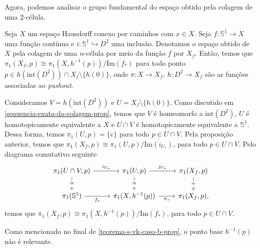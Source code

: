 Agora, podemos analisar o grupo fundamental do espaço obtido pela colagem de uma 2-célula.

\begin{corol}
    Seja $X$ um espaço Hausdorff conexo por caminhos com $x\in X$. Seja $f:\mathbb{S}^{1}\rightarrow X$ uma função contínua e $i:\mathbb{S}^{1}\hookrightarrow D^2$ uma inclusão. Denotamos o espaço obtido de $X$ pela colagem de uma $n$-célula por meio da função $f$ por $X_f$. Então, temos que $\pi_1(X_f, p)\cong \pi_1(X,h^{-1}(p))/\overline{\text{Im}(f_*)}$ para todo ponto $p\in h(\text{int}(D^2))\cap X_f\setminus\{h(0)\}$, onde $\pi:X\rightarrow X_f$, $h:D^2\rightarrow X_f$ são as funções associadas ao \emph{pushout}.
\end{corol}
\begin{dem}
     Consideramos $V=h(\text{int}(D^2))$ e $U=X_f\setminus \{h(0)\}$. Como discutido em \ref{sequencia-exata-da-colagem-prop}, temos que $V$ é homeomorfo a $\text{int}(D^2)$, $U$ é homotopicamente equivalente a $X$ e $U\cap V$ é homotopicamente equivalente a $\mathbb{S}^{1}$. Dessa forma, temos $\pi_1(U,p)=\{e\}$ para todo $p\in U\cap V$. Pela proposição anterior, temos que $\pi_1(X_f,p)\cong \pi_1(U, p)/\overline{\text{Im}(i_{U_*})}$, para todo $p\in U\cap V$. Pelo diagrama comutativo seguinte 
\[\begin{tikzcd}
	{\pi_1(U\cap V,p)} & {\pi_1(U,p)} & {\pi_1(X_f,p)} \\
	{\pi_1(\mathbb{S}^1)} & {\pi_1(X,h^{-1}(p))} & {\pi_1(X_f,p)},
	\arrow["{i_{U_*}}", from=1-1, to=1-2]
	\arrow["\cong"{description}, from=1-1, to=2-1]
	\arrow["{j_{U_*}}", from=1-2, to=1-3]
	\arrow["\cong"{description}, from=1-2, to=2-2]
	\arrow["{=}"{description}, from=1-3, to=2-3]
	\arrow["{f_*}"', from=2-1, to=2-2]
	\arrow["{\pi_*}"', from=2-2, to=2-3]
\end{tikzcd}\]
     temos que $\pi_1(X_f, p)\cong \pi_1(X,h^{-1}(p))/\overline{\text{Im}(f_*)}$, para todo $p\in U\cap V$.
\end{dem}

Como mencionado no final de \ref{teorema-s-vk-caso-b-prop}, o ponto base $h^{-1}(p)$ não é relevante.
